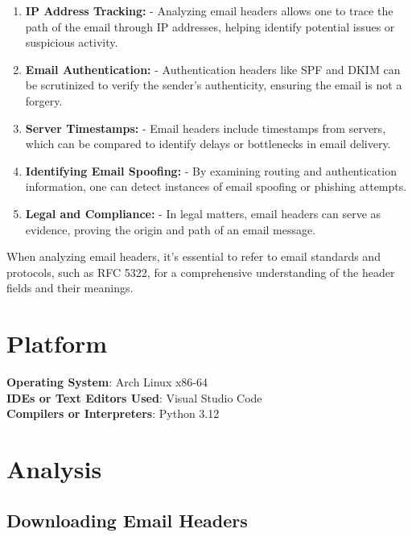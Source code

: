\documentclass[11pt]{article}
\begin{document}
\begin{enumerate}
    \item \textbf{IP Address Tracking:}
          - Analyzing email headers allows one to trace the path of the email through IP addresses, helping identify potential issues or suspicious activity.

    \item \textbf{Email Authentication:}
          - Authentication headers like SPF and DKIM can be scrutinized to verify the sender's authenticity, ensuring the email is not a forgery.

    \item \textbf{Server Timestamps:}
          - Email headers include timestamps from servers, which can be compared to identify delays or bottlenecks in email delivery.

    \item \textbf{Identifying Email Spoofing:}
          - By examining routing and authentication information, one can detect instances of email spoofing or phishing attempts.

    \item \textbf{Legal and Compliance:}
          - In legal matters, email headers can serve as evidence, proving the origin and path of an email message.
\end{enumerate}

When analyzing email headers, it's essential to refer to email standards and protocols, such as RFC 5322, for a comprehensive understanding of the header fields and their meanings.


\section{Platform}
\textbf{Operating System}: Arch Linux x86-64 \\
\textbf{IDEs or Text Editors Used}: Visual Studio Code\\
\textbf{Compilers or Interpreters}: Python 3.12\\

\section{Analysis}
\hypertarget{downloading-email-headers}{%
\subsection{Downloading Email Headers}\label{downloading-email-headers}}
\end{document}
